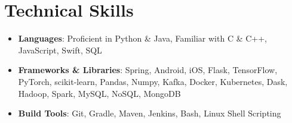 \documentclass[letterpaper,10pt]{article}
\newcommand{\resumeSubHeadingListStart}{\begin{itemize}[label=$\circ$,leftmargin=\hoffset]}
\newcommand{\resumeSubHeadingListEnd}{\end{itemize}}
\begin{document}
	\section{\faBolt \space Technical Skills}
	\resumeSubHeadingListStart
	\item{
		\textbf{Languages}{: Proficient in Python \& Java, Familiar with C \& C++, JavaScript, Swift, SQL}}
	\vspace{-4pt}
	\item{
		\textbf{Frameworks \& Libraries}{: Spring, Android, iOS, Flask, TensorFlow, PyTorch, scikit-learn, Pandas, Numpy, Kafka, Docker, Kubernetes, Dask, Hadoop, Spark, MySQL, NoSQL, MongoDB}}
	\vspace{-4pt}
	\item{
		\textbf{Build Tools}{: Git, Gradle, Maven, Jenkins, Bash, Linux Shell Scripting}}
	\resumeSubHeadingListEnd
	
	
	
\end{document}
